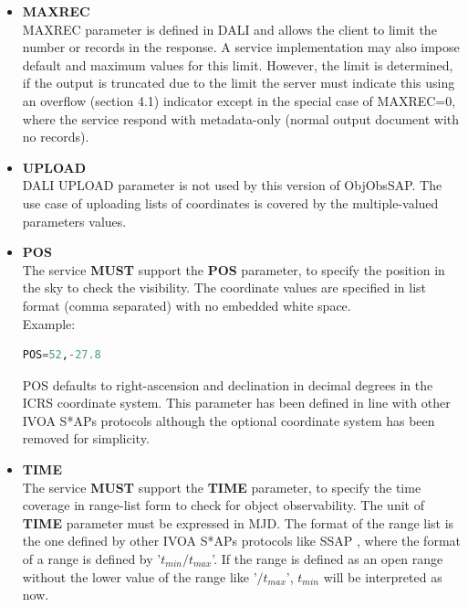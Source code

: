 \documentclass[11pt,a4paper]{ivoatex/ivoa}
\begin{document}
\begin{itemize}
\item{\textbf{MAXREC}\\MAXREC parameter is defined in DALI and allows
the client to limit the number or records in the response. A service
implementation may also impose default and maximum values for this limit.
However, the limit is determined, if the output is truncated due to the
limit the server must indicate this using an overflow (section 4.1)
indicator except in the special case of MAXREC=0, where the service
respond with metadata-only (normal output document with no records).}

\item{\textbf{UPLOAD}\\DALI UPLOAD parameter is not used by this version
of ObjObsSAP. The use case of uploading lists of coordinates is covered
by the multiple-valued parameters values.}

\item{\textbf{POS}\\The service \textbf{MUST }support the
\textbf{POS} parameter, to specify the position in the sky to check the visibility. 
The coordinate values are specified in list format (comma separated) with no embedded white
space.\\
Example:\\
\begin{lstlisting}[language=SQL]
POS=52,-27.8
\end{lstlisting}
\par
POS defaults to right-ascension and declination in decimal degrees in
the ICRS coordinate system. This parameter has been defined in line with
other IVOA S*APs protocols although the optional coordinate system has
been removed for simplicity.}

\item{\textbf{TIME}\\The service \textbf{MUST} support the
\textbf{TIME} parameter, to specify the time coverage in range-list form
to check for object observability. The unit of \textbf{TIME} parameter must be
expressed in MJD. The format of the range list is the one defined by other
IVOA S*APs protocols like SSAP \citep{std:SSAP}, where the format of a
range is defined by '$t_{min}\slash t_{max}$'. If the range is defined
as an open range without the lower value of the range like '$\slash t_{max}$',
$t_{min}$ will be interpreted as now.\\

}
\end{itemize}
\end{document}

